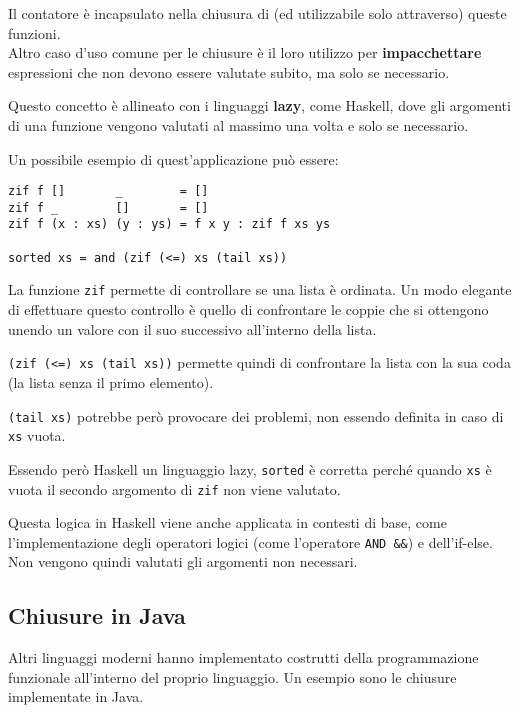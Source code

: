 \documentclass{article}
\begin{document}
Il contatore è incapsulato nella chiusura di (ed utilizzabile solo attraverso) queste funzioni.\vspace{14pt}\\
Altro caso d'uso comune per le chiusure è il loro utilizzo per \textbf{impacchettare} espressioni che non devono essere valutate subito, ma solo se necessario.

Questo concetto è allineato con i linguaggi \textbf{lazy}, come Haskell, dove gli argomenti di una funzione vengono valutati al massimo una volta e solo se necessario.

Un possibile esempio di quest'applicazione può essere:
\begin{tcolorbox}
\begin{verbatim}
zif f []       _        = []
zif f _        []       = []
zif f (x : xs) (y : ys) = f x y : zif f xs ys

sorted xs = and (zif (<=) xs (tail xs))
\end{verbatim}
\end{tcolorbox}

La funzione \texttt{zif} permette di controllare se una lista è ordinata. Un modo elegante di effettuare questo controllo è quello di confrontare le coppie che si ottengono unendo un valore con il suo successivo all'interno della lista.

\texttt{(zif (<=) xs (tail xs))} permette quindi di confrontare la lista con la sua coda (la lista senza il primo elemento).

\texttt{(tail xs)} potrebbe però provocare dei problemi, non essendo definita in caso di \texttt{xs} vuota.

Essendo però Haskell un linguaggio lazy, \texttt{sorted} è corretta perché quando \texttt{xs} è vuota il secondo argomento di \texttt{zif} non viene valutato.

Questa logica in Haskell viene anche applicata in contesti di base, come l'implementazione degli operatori logici (come l'operatore \texttt{AND \&\&}) e dell'if-else. Non vengono quindi valutati gli argomenti non necessari.

\pagebreak

\subsection*{Chiusure in Java}
Altri linguaggi moderni hanno implementato costrutti della programmazione funzionale all'interno del proprio linguaggio. Un esempio sono le chiusure implementate in Java.
\end{document}
